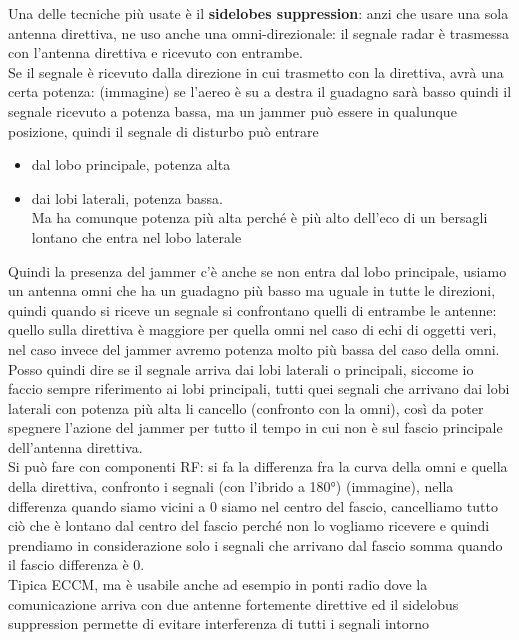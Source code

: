 \documentclass[oneside, 12pt]{extbook}
\begin{document}
Una delle tecniche più usate è il \textbf{sidelobes suppression}: anzi che usare una sola antenna direttiva, ne uso anche una omni-direzionale: il segnale radar è trasmessa con l'antenna direttiva e ricevuto con entrambe.
\\Se il segnale è ricevuto dalla direzione in cui trasmetto con la direttiva, avrà una certa potenza: (immagine)
se l'aereo è su a destra il guadagno sarà basso quindi il segnale ricevuto a potenza bassa, ma un jammer può essere in qualunque posizione, quindi il segnale di disturbo può entrare
\begin{itemize}
	\item dal lobo principale, potenza alta
	\item dai lobi laterali, potenza bassa.\\
	Ma ha comunque potenza più alta perché è più alto dell'eco di un bersagli lontano che entra nel lobo laterale
\end{itemize}
Quindi la presenza del jammer c'è anche se non entra dal lobo principale, usiamo un antenna omni che ha un guadagno più basso ma uguale in tutte le direzioni, quindi quando si riceve un segnale si confrontano quelli di entrambe le antenne: quello sulla direttiva è maggiore per quella omni nel caso di echi di oggetti veri, nel caso invece del jammer avremo potenza molto più bassa del caso della omni.\\
Posso quindi dire se il segnale arriva dai lobi laterali o principali, siccome io faccio sempre riferimento ai lobi principali, tutti quei segnali che arrivano dai lobi laterali con potenza più alta li cancello (confronto con la omni), così da poter spegnere l'azione del jammer per tutto il tempo in cui non è sul fascio principale dell'antenna direttiva.\\
Si può fare con componenti RF: si fa la differenza fra la curva della omni e quella della direttiva, confronto i segnali (con l'ibrido a 180°) (immagine), nella differenza quando siamo vicini a 0 siamo nel centro del fascio, cancelliamo tutto ciò che è lontano dal centro del fascio perché non lo vogliamo ricevere e quindi prendiamo in considerazione solo i segnali che arrivano dal fascio somma quando il fascio differenza è 0.\\
Tipica ECCM, ma è usabile anche ad esempio in ponti radio dove la comunicazione arriva con due antenne fortemente direttive ed il sidelobus suppression permette di evitare interferenza di tutti i segnali intorno
\end{document}
